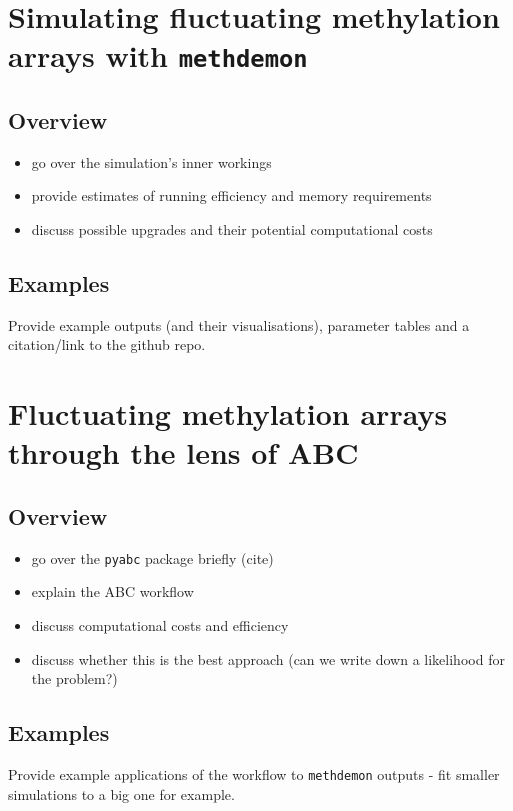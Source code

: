 \section{Simulating fluctuating methylation arrays with \texttt{methdemon}}
\subsection{Overview}
\begin{itemize}
    \item go over the simulation's inner workings
    \item provide estimates of running efficiency and memory requirements
    \item discuss possible upgrades and their potential computational costs
\end{itemize}
\subsection{Examples}
Provide example outputs (and their visualisations), parameter tables and a citation/link to the github repo.

\section{Fluctuating methylation arrays through the lens of ABC}
\subsection{Overview}
\begin{itemize}
    \item go over the \texttt{pyabc} package briefly (cite)
    \item explain the ABC workflow
    \item discuss computational costs and efficiency
    \item discuss whether this is the best approach (can we write down a likelihood for the problem?)
\end{itemize}
\subsection{Examples}
Provide example applications of the workflow to \texttt{methdemon} outputs - fit smaller simulations to a big one for example.
